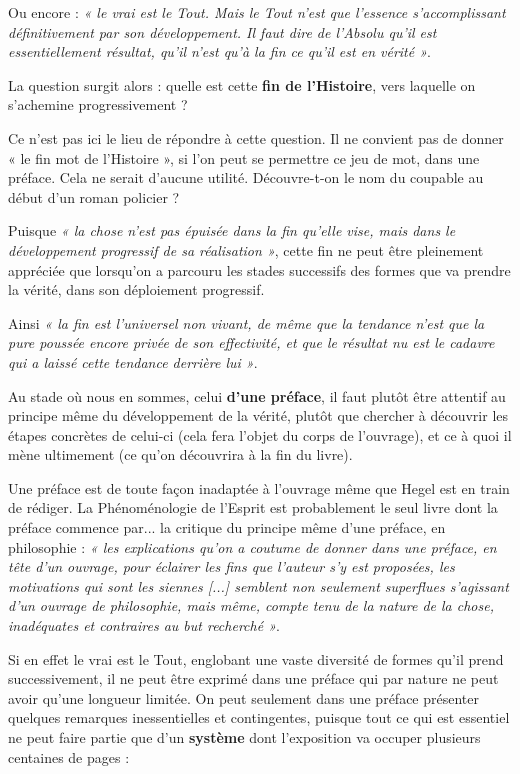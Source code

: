 Ou encore : {\it « le vrai est le Tout. Mais le Tout n’est que l’essence s’accomplissant définitivement par son développement. Il faut dire de l’Absolu qu’il est essentiellement résultat, qu’il n’est qu’à la fin ce qu’il est en vérité »}.

La question surgit alors : quelle est cette {\bf fin de l’Histoire}, vers laquelle on s’achemine progressivement ?

Ce n’est pas ici le lieu de répondre à cette question. Il ne convient pas de donner « le fin mot de l’Histoire », si l’on peut se permettre ce jeu de mot, dans une préface. Cela ne serait d’aucune utilité. Découvre-t-on le nom du coupable au début d’un roman policier ?

Puisque {\it « la chose n’est pas épuisée dans la fin qu’elle vise, mais dans le développement progressif de sa réalisation »}, cette fin ne peut être pleinement appréciée que lorsqu’on a parcouru les stades successifs des formes que va prendre la vérité, dans son déploiement progressif.

Ainsi {\it « la fin est l’universel non vivant, de même que la tendance n’est que la pure poussée encore privée de son effectivité, et que le résultat nu est le cadavre qui a laissé cette tendance derrière lui »}.

Au stade où nous en sommes, celui {\bf d’une préface}, il faut plutôt être attentif au principe même du développement de la vérité, plutôt que chercher à découvrir les étapes concrètes de celui-ci (cela fera l’objet du corps de l’ouvrage), et ce à quoi il mène ultimement (ce qu’on découvrira à la fin du livre).

Une préface est de toute façon inadaptée à l’ouvrage même que Hegel est en train de rédiger. La Phénoménologie de l’Esprit est probablement le seul livre dont la préface commence par... la critique du principe même d’une préface, en philosophie : {\it « les explications qu’on a coutume de donner dans une préface, en tête d’un ouvrage, pour éclairer les fins que l’auteur s’y est proposées, les motivations qui sont les siennes [...] semblent non seulement superflues s’agissant d’un ouvrage de philosophie, mais même, compte tenu de la nature de la chose, inadéquates et contraires au but recherché »}.

Si en effet le vrai est le Tout, englobant une vaste diversité de formes qu’il prend successivement, il ne peut être exprimé dans une préface qui par nature ne peut avoir qu’une longueur limitée. On peut seulement dans une préface présenter quelques remarques inessentielles et contingentes, puisque tout ce qui est essentiel ne peut faire partie que d’un {\bf système} dont l’exposition va occuper plusieurs centaines de pages :

